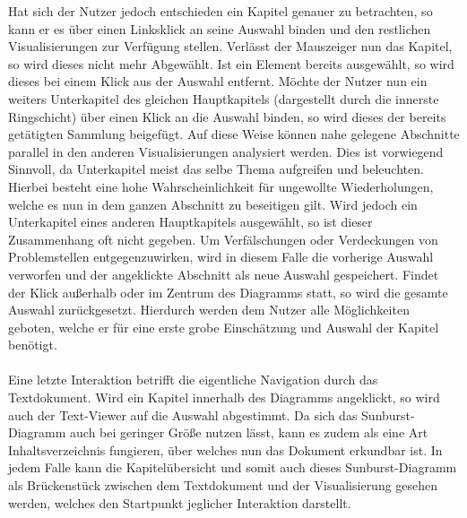 Hat sich der Nutzer jedoch entschieden ein Kapitel genauer zu betrachten, so kann er es \"uber einen Linksklick an seine Auswahl binden und den restlichen Visualisierungen zur Verf\"ugung stellen. Verl\"asst der Mauszeiger nun das Kapitel, so wird dieses nicht mehr Abgew\"ahlt. Ist ein Element bereits ausgew\"ahlt, so wird dieses bei einem Klick aus der Auswahl entfernt. M\"ochte der Nutzer nun ein weiters Unterkapitel des gleichen Hauptkapitels (dargestellt durch die innerste Ringschicht) \"uber einen Klick an die Auswahl binden, so wird dieses der bereits get\"atigten Sammlung beigef\"ugt. Auf diese Weise k\"onnen nahe gelegene Abschnitte parallel in den anderen Visualisierungen analysiert werden. Dies ist vorwiegend Sinnvoll, da Unterkapitel meist das selbe Thema aufgreifen und beleuchten. Hierbei besteht eine hohe Wahrscheinlichkeit f\"ur ungewollte Wiederholungen, welche es nun in dem ganzen Abschnitt zu beseitigen gilt. Wird jedoch ein Unterkapitel eines anderen Hauptkapitels ausgew\"ahlt, so ist dieser Zusammenhang oft nicht gegeben. Um Verf\"alschungen oder Verdeckungen von Problemstellen entgegenzuwirken, wird in diesem Falle die vorherige Auswahl verworfen und der angeklickte Abschnitt als neue Auswahl gespeichert. Findet der Klick au{\ss}erhalb oder im Zentrum des Diagramms statt, so wird die gesamte Auswahl zur\"uckgesetzt. Hierdurch werden dem Nutzer alle M\"oglichkeiten geboten, welche er f\"ur eine erste grobe Einsch\"atzung und Auswahl der Kapitel ben\"otigt.\\
\\
Eine letzte Interaktion betrifft die eigentliche Navigation durch das Textdokument. Wird ein Kapitel innerhalb des Diagramms angeklickt, so wird auch der Text-Viewer auf die Auswahl abgestimmt. Da sich das Sunburst-Diagramm auch bei geringer Gr\"o{\ss}e nutzen l\"asst, kann es zudem  als eine Art Inhaltsverzeichnis fungieren, \"uber welches nun das Dokument erkundbar ist. In jedem Falle kann die Kapitel\"ubersicht und somit auch dieses Sunburst-Diagramm als Br\"uckenst\"uck zwischen dem Textdokument und der Visualisierung gesehen werden, welches den Startpunkt jeglicher Interaktion darstellt.

